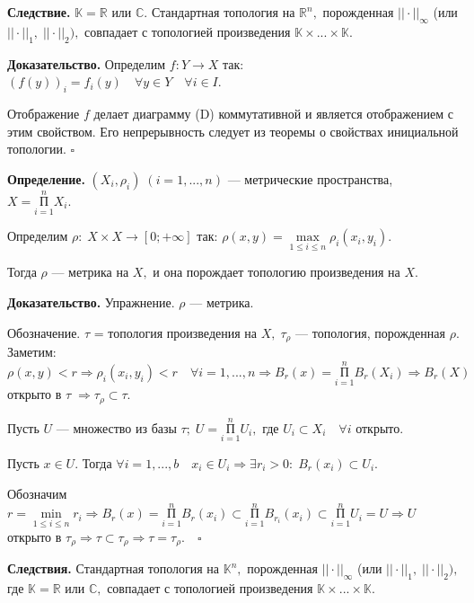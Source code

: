 \documentclass[12pt,a4paper]{article}
\begin{document}
\textbf{Следствие.} $\mathbb{K} = \mathbb{R}$ или $\mathbb{C}.$ Стандартная топология на $\mathbb{R}^{n},$ порожденная $|| \cdot ||_{\infty}$ (или $|| \cdot ||_{1}, \; || \cdot ||_{2}),$ совпадает с топологией произведения $\mathbb{K} \times ... \times \mathbb{K}.$ 
 
\textbf{Доказательство.} Определим $f\!\!: Y \to X$ так: $(f(y))_{i} = f_{i}(y) \quad \forall y \in Y \quad \forall i \in I.$ 

Отображение $f$ делает диаграмму (D) коммутативной и является отображением с этим свойством. Его непрерывность следует из теоремы о свойствах инициальной топологии. $\square$

\textbf{Определение.} $(X_{i}, \rho_{i}) \; (i = 1, ..., n)$ --- метрические пространства, $X = \underset{i = 1}{\overset{n}{\text{П}}} X_{i}.$ 

Определим $\rho\!\!: \; X \times X \to [0; +\infty]$ так: $\rho(x, y) = \underset{1 \leq i \leq n}{\max} \rho_{i} (x_{i}, y_{i}).$ 

Тогда $\rho$ --- метрика на $X,$ и она порождает топологию произведения на $X.$ 

\textbf{Доказательство.} Упражнение. $\rho$ --- метрика. 

Обозначение. $\tau$ = топология произведения на $X, \; \tau_{\rho}$ --- топология, порожденная $\rho.$ Заметим: $\rho(x, y) < r \Rightarrow \rho_{i} (x_{i}, y_{i}) < r \quad \forall i = 1, ..., n \Rightarrow B_{r} (x) = \underset{i = 1}{\overset{n}{\text{П}}} B_{r}(X_{i}) \Rightarrow B_{r} (X)$ открыто в $\tau \; \Rightarrow \tau_{\rho} \subset \tau.$ 

Пусть $U$ --- множество из базы $\tau; \; U = \underset{i = 1}{\overset{n}{\text{П}}} U_{i},$ где $U_{i} \subset X_{i} \quad \forall i$ открыто. 

Пусть $x \in U.$ Тогда $\forall i = 1, ..., b \quad x_{i} \in U_{i} \Rightarrow \exists r_{i} > 0: \; B_{r}(x_{i}) \subset U_{i}.$ 

Обозначим $r = \underset{1 \leq i \leq n}{\min} r_{i} \Rightarrow B_{r}(x) = \underset{i = 1}{\overset{n}{\text{П}}} B_{r} (x_{i}) \subset \underset{i = 1}{\overset{n}{\text{П}}} B_{r_{i}} (x_{i}) \subset \underset{i = 1}{\overset{n}{\text{П}}} U_{i} = U \Rightarrow U$ открыто в $\tau_{\rho} \Rightarrow \tau \subset \tau_{\rho} \Rightarrow \tau = \tau_{\rho}. \quad \square$ 

\textbf{Следствия.} Стандартная топология на $\mathbb{K}^{n},$ порожденная $|| \cdot ||_{\infty}$ (или $|| \cdot||_{1}, \; || \cdot ||_{2}),$ где $\mathbb{K} = \mathbb{R}$ или $\mathbb{C},$ совпадает с топологией произведения $\mathbb{K} \times ... \times \mathbb{K}.$ 
\end{document}
